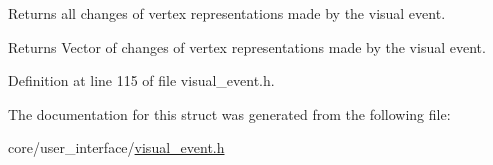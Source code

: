 Returns all changes of vertex representations made by the visual event. 

\begin{DoxyReturn}{Returns}
Vector of changes of vertex representations made by the visual event. 
\end{DoxyReturn}


Definition at line 115 of file visual\+\_\+event.\+h.



The documentation for this struct was generated from the following file\+:\begin{DoxyCompactItemize}
\item 
core/user\+\_\+interface/\hyperlink{visual__event_8h}{visual\+\_\+event.\+h}\end{DoxyCompactItemize}
